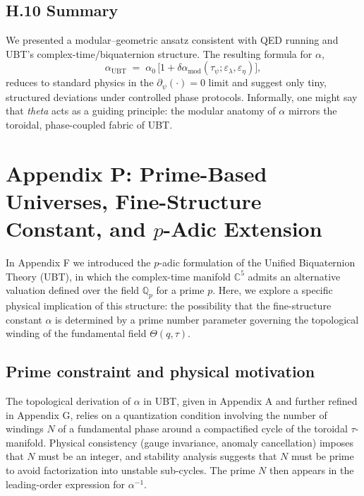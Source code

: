 \subsection*{H.10 Summary}
We presented a modular--geometric ansatz consistent with QED running and UBT's complex-time/biquaternion structure. 
The resulting formula for $\alpha$,
\begin{equation}
\alpha_{\mathrm{UBT}} \;=\; \alpha_0\,\big[ 1 + \delta\alpha_{\mathrm{mod}}(\tau_\psi;\varepsilon_\lambda,\varepsilon_\eta) \big],
\end{equation}
reduces to standard physics in the $\partial_\psi(\cdot)=0$ limit and suggest only tiny, structured deviations under controlled phase protocols.
Informally, one might say that \emph{theta} acts as a guiding principle: the modular anatomy of $\alpha$ mirrors the toroidal, phase-coupled fabric of UBT.




\appendix
\section{Appendix P: Prime-Based Universes, Fine-Structure Constant, and $p$-Adic Extension}

In Appendix F we introduced the $p$-adic formulation of the Unified Biquaternion Theory (UBT), in which the complex-time manifold $\mathbb{C}^5$ admits an alternative valuation defined over the field $\mathbb{Q}_p$ for a prime $p$. Here, we explore a specific physical implication of this structure: the possibility that the fine-structure constant $\alpha$ is determined by a prime number parameter governing the topological winding of the fundamental field $\Theta(q,\tau)$.

\subsection*{Prime constraint and physical motivation}
The topological derivation of $\alpha$ in UBT, given in Appendix A and further refined in Appendix G, relies on a quantization condition involving the number of windings $N$ of a fundamental phase around a compactified cycle of the toroidal $\tau$-manifold. Physical consistency (gauge invariance, anomaly cancellation) imposes that $N$ must be an integer, and stability analysis suggests that $N$ must be prime to avoid factorization into unstable sub-cycles. The prime $N$ then appears in the leading-order expression for $\alpha^{-1}$.

